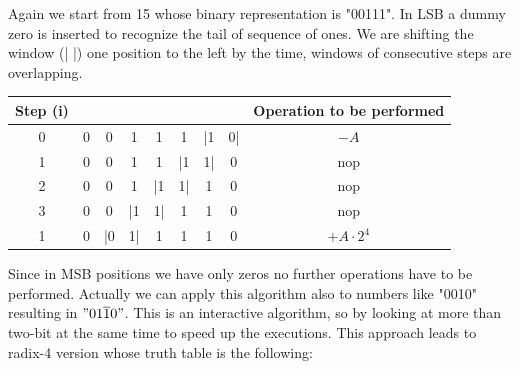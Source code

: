 Again we start from 15 whose binary representation is "00111". In LSB a dummy zero is inserted to recognize the tail of sequence of ones. We are shifting the window (| |) one position to the left by the time, windows of consecutive steps are overlapping.
\begin{center}
\begin{tabular}{|c|c|c|c|c|c|c|c|c|}
  \hline
  Step (i)& & & & & & & & Operation to be performed\\
  \hline
    0&    0&    0&  1&  1&  1&  |1& 0|&   $-A$\\
    1&    0&    0&  1&  1&  |1&  1|&  0&    nop\\
    2&    0&    0&  1&  |1&   1|&  1& 0&    nop\\
    3&    0&    0&  |1& 1|&   1&   1& 0&    nop\\
    1&    0&    |0& 1|& 1&    1&   1& 0&    $+A \cdot 2^4$\\
  \hline
\end{tabular}
\end{center}
Since in MSB positions we have only zeros no further operations have to be performed. Actually we can apply this algorithm also to numbers like "0010" resulting in $"01\overline{1}0"$. This is an interactive algorithm, so by looking at more than two-bit at the same time to speed up the executions. This approach leads to radix-4 version whose truth table is the following:
